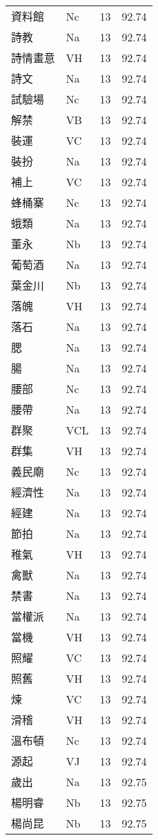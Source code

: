 \documentclass[twocolumn]{book}
\begin{document}
\begin{supertabular}{llrr}
資料館 & Nc & 13 &  92.74\\
詩教 & Na & 13 &  92.74\\
詩情畫意 & VH & 13 &  92.74\\
詩文 & Na & 13 &  92.74\\
試驗場 & Nc & 13 &  92.74\\
解禁 & VB & 13 &  92.74\\
裝運 & VC & 13 &  92.74\\
裝扮 & Na & 13 &  92.74\\
補上 & VC & 13 &  92.74\\
蜂桶寨 & Nc & 13 &  92.74\\
蛾類 & Na & 13 &  92.74\\
董永 & Nb & 13 &  92.74\\
葡萄酒 & Na & 13 &  92.74\\
葉金川 & Nb & 13 &  92.74\\
落魄 & VH & 13 &  92.74\\
落石 & Na & 13 &  92.74\\
腮 & Na & 13 &  92.74\\
腸 & Na & 13 &  92.74\\
腰部 & Nc & 13 &  92.74\\
腰帶 & Na & 13 &  92.74\\
群聚 & VCL & 13 &  92.74\\
群集 & VH & 13 &  92.74\\
義民廟 & Nc & 13 &  92.74\\
經濟性 & Na & 13 &  92.74\\
經建 & Na & 13 &  92.74\\
節拍 & Na & 13 &  92.74\\
稚氣 & VH & 13 &  92.74\\
禽獸 & Na & 13 &  92.74\\
禁書 & Na & 13 &  92.74\\
當權派 & Na & 13 &  92.74\\
當機 & VH & 13 &  92.74\\
照耀 & VC & 13 &  92.74\\
照舊 & VH & 13 &  92.74\\
煉 & VC & 13 &  92.74\\
滑稽 & VH & 13 &  92.74\\
溫布頓 & Nc & 13 &  92.74\\
源起 & VJ & 13 &  92.74\\
歲出 & Na & 13 &  92.75\\
楊明睿 & Nb & 13 &  92.75\\
楊尚昆 & Nb & 13 &  92.75\\

\end{supertabular}
\end{document}
